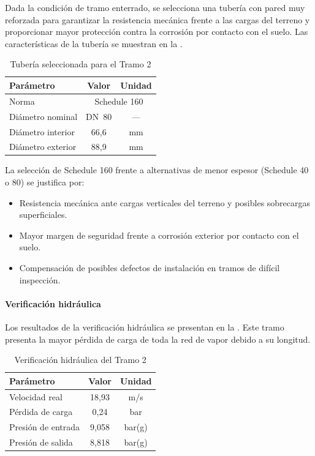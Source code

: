 \documentclass[12pt]{article}
\begin{document}
Dada la condición de tramo enterrado, se selecciona una tubería con pared muy reforzada para garantizar la resistencia mecánica frente a las cargas del terreno y proporcionar mayor protección contra la corrosión por contacto con el suelo. Las características de la tubería se muestran en la .

\begin{table}[H]
	\centering
	\caption{Tubería seleccionada para el Tramo 2}
	\label{tab:tuberia-tramo2}
	\begin{tabular}{lcc}
		\toprule
		\textbf{Parámetro} & \textbf{Valor}                   & \textbf{Unidad} \\
		\midrule
		Norma              & \multicolumn{2}{c}{Schedule 160}                   \\
		Diámetro nominal   & DN~80                            & ---             \\
		Diámetro interior  & 66{,}6                           & mm              \\
		Diámetro exterior  & 88{,}9                           & mm              \\
		\bottomrule
	\end{tabular}
\end{table}

La selección de Schedule 160 frente a alternativas de menor espesor (Schedule 40 o 80) se justifica por:
\begin{itemize}[noitemsep]
	\item Resistencia mecánica ante cargas verticales del terreno y posibles sobrecargas superficiales.
	\item Mayor margen de seguridad frente a corrosión exterior por contacto con el suelo.
	\item Compensación de posibles defectos de instalación en tramos de difícil inspección.
\end{itemize}

\paragraph{Verificación hidráulica}

Los resultados de la verificación hidráulica se presentan en la . Este tramo presenta la mayor pérdida de carga de toda la red de vapor debido a su longitud.

\begin{table}[H]
	\centering
	\caption{Verificación hidráulica del Tramo 2}
	\label{tab:hidraulica-tramo2}
	\begin{tabular}{lcc}
		\toprule
		\textbf{Parámetro} & \textbf{Valor} & \textbf{Unidad} \\
		\midrule
		Velocidad real     & 18{,}93        & m/s             \\
		Pérdida de carga   & 0{,}24         & bar             \\
		Presión de entrada & 9{,}058        & bar(g)          \\
		Presión de salida  & 8{,}818        & bar(g)          \\
		\bottomrule
	\end{tabular}
\end{table}
\end{document}
